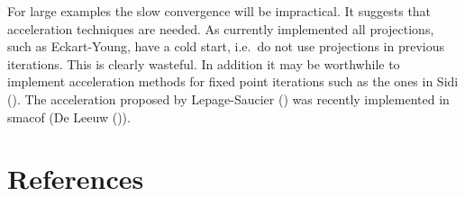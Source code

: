 \documentclass[
  12pt,
  letterpaper,
  DIV=11,
  numbers=noendperiod]{scrartcl}
\newcommand{\sectionbreak}{\clearpage}
\begin{document}
For large examples the slow convergence will be impractical. It suggests
that acceleration techniques are needed. As currently implemented all
projections, such as Eckart-Young, have a cold start, i.e.~do not use
projections in previous iterations. This is clearly wasteful. In
addition it may be worthwhile to implement acceleration methods for
fixed point iterations such as the ones in Sidi
(). The acceleration proposed by
Lepage-Saucier () was recently
implemented in smacof (De Leeuw ()).

\sectionbreak

\section*{References}\label{references}
\end{document}
